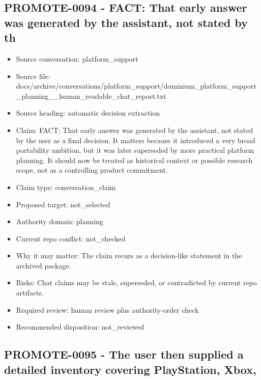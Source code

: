 \documentclass[11pt,a4paper]{report}
\begin{document}
\subsection{PROMOTE-0094 - FACT: That early answer was generated by the assistant, not stated by th}

\begin{itemize}
\item Source conversation: platform\_support
\item Source file: docs/archive/conversations/platform\_support/dominium\_platform\_support\_planning\_\_human\_readable\_chat\_report.txt
\item Source heading: automatic decision extraction
\item Claim: FACT: That early answer was generated by the assistant, not stated by the user as a final decision. It matters because it introduced a very broad portability ambition, but it was later superseded by more practical platform planning. It should now be treated as historical context or possible research scope, not as a controlling product commitment.
\item Claim type: conversation\_claim
\item Proposed target: not\_selected
\item Authority domain: planning
\item Current repo conflict: not\_checked
\item Why it may matter: The claim recurs as a decision-like statement in the archived package.
\item Risks: Chat claims may be stale, superseded, or contradicted by current repo artifacts.
\item Required review: human review plus authority-order check
\item Recommended disposition: not\_reviewed
\end{itemize}

\subsection{PROMOTE-0095 - The user then supplied a detailed inventory covering PlayStation, Xbox,}
\end{document}
